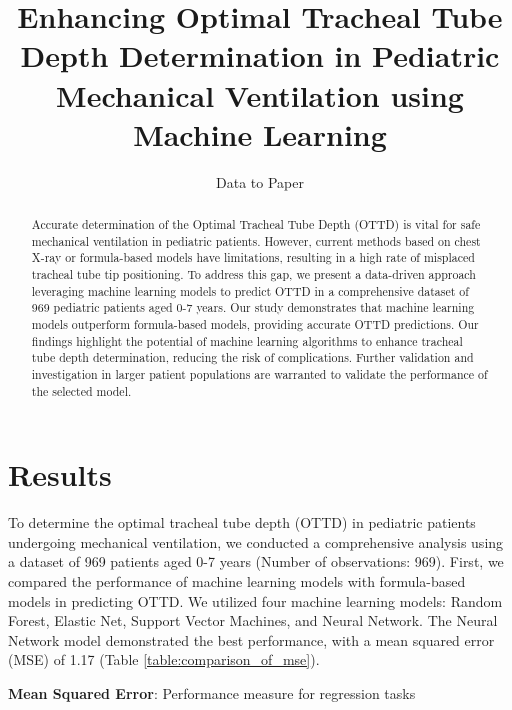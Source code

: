 \documentclass[11pt]{article}
\title{Enhancing Optimal Tracheal Tube Depth Determination in Pediatric Mechanical Ventilation using Machine Learning}
\author{Data to Paper}
\begin{document}
\maketitle
\begin{abstract}
Accurate determination of the Optimal Tracheal Tube Depth (OTTD) is vital for safe mechanical ventilation in pediatric patients. However, current methods based on chest X-ray or formula-based models have limitations, resulting in a high rate of misplaced tracheal tube tip positioning. To address this gap, we present a data-driven approach leveraging machine learning models to predict OTTD in a comprehensive dataset of 969 pediatric patients aged 0-7 years. Our study demonstrates that machine learning models outperform formula-based models, providing accurate OTTD predictions. Our findings highlight the potential of machine learning algorithms to enhance tracheal tube depth determination, reducing the risk of complications. Further validation and investigation in larger patient populations are warranted to validate the performance of the selected model.
\end{abstract}
\section*{Results}

To determine the optimal tracheal tube depth (OTTD) in pediatric patients undergoing mechanical ventilation, we conducted a comprehensive analysis using a dataset of 969 patients aged 0-7 years (Number of observations: 969). First, we compared the performance of machine learning models with formula-based models in predicting OTTD. We utilized four machine learning models: Random Forest, Elastic Net, Support Vector Machines, and Neural Network. The Neural Network model demonstrated the best performance, with a mean squared error (MSE) of 1.17 (Table {}\ref{table:comparison_of_mse}).

\begin{table}[h]
\caption{Comparison of Mean Squared Error between Machine Learning Model and Formula-Based Models}
\label{table:comparison_of_mse}
\begin{threeparttable}
\renewcommand{\TPTminimum}{\linewidth}
\begin{tablenotes}
\footnotesize
\item \textbf{Mean Squared Error}: Performance measure for regression tasks
\end{tablenotes}
\end{threeparttable}
\end{table}
\end{document}
